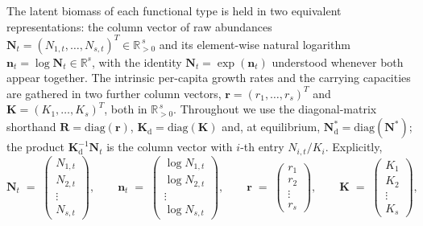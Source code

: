 \documentclass[12pt]{article}
\begin{document}
The latent biomass of each functional type is held in two equivalent representations: the column vector of raw abundances $\mathbf{N}_{t}=(N_{1,t},\ldots,N_{s,t})^{T}\in\mathbb{R}_{>0}^{\,s}$ and its element-wise natural logarithm $\mathbf{n}_{t}=\log\mathbf{N}_{t}\in\mathbb{R}^{s}$, with the identity $\mathbf{N}_{t}=\exp(\mathbf{n}_{t})$ understood whenever both appear together. The intrinsic per-capita growth rates and the carrying capacities are gathered in two further column vectors, $\mathbf{r}=(r_{1},\ldots,r_{s})^{T}$ and $\mathbf{K}=(K_{1},\ldots,K_{s})^{T}$, both in $\mathbb{R}_{>0}^{\,s}$. Throughout we use the diagonal-matrix shorthand $\mathbf{R}=\mathrm{diag}(\mathbf{r})$, $\mathbf{K}_{\mathrm{d}}=\mathrm{diag}(\mathbf{K})$ and, at equilibrium, $\mathbf{N}^{*}_{\mathrm{d}}=\mathrm{diag}(\mathbf{N}^{*})$; the product $\mathbf{K}_{\mathrm{d}}^{-1}\mathbf{N}_{t}$ is the column vector with $i$-th entry $N_{i,t}/K_{i}$. Explicitly,
\begin{equation*}
	\mathbf{N}_{t} \;=\; \begin{pmatrix} N_{1,t} \\ N_{2,t} \\ \vdots \\ N_{s,t} \end{pmatrix},\qquad
	\mathbf{n}_{t} \;=\; \begin{pmatrix} \log N_{1,t} \\ \log N_{2,t} \\ \vdots \\ \log N_{s,t} \end{pmatrix},\qquad
	\mathbf{r} \;=\; \begin{pmatrix} r_{1} \\ r_{2} \\ \vdots \\ r_{s} \end{pmatrix},\qquad
	\mathbf{K} \;=\; \begin{pmatrix} K_{1} \\ K_{2} \\ \vdots \\ K_{s} \end{pmatrix},
\end{equation*}
\end{document}
